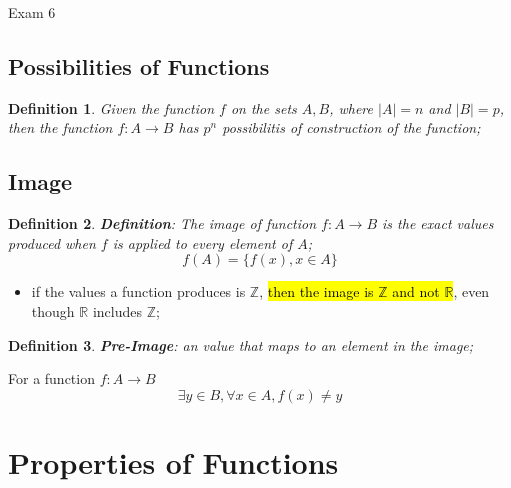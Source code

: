 \documentclass{note}
\newtheorem{definition}{Definition}
\begin{document}
\begin{note}{Exam 6}
        \subsection{Possibilities of Functions}

        \begin{definition}
            Given the function $ f $ on the sets $ A, B $, where $ \left| A \right| = n $ and $ \left| B \right| = p $, then the function
            $ f: A \to B $ has $ p^{n} $ possibilitis of construction of the function;
        \end{definition}

        \subsection{Image}

        \begin{definition}
            \textbf{Definition}: The image of function $ f: A \to B $ is the exact values produced when $ f $ is applied to every element
            of $ A $;
            \begin{equation}\label{eq: definition of image}
                f \left( A \right) = \{ f \left( x \right), x \in A \}
            \end{equation}
        \end{definition}

        \begin{itemize}
            \item if the values a function produces is $ \mathbb{Z} $, \hl{then the image is $ \mathbb{Z} $ and not $ \mathbb{R} $},
            even  though $ \mathbb{R} $ includes $ \mathbb{Z} $;
        \end{itemize}

        \begin{definition}
            \textbf{Pre-Image}: an value that maps to an element in the image;
        \end{definition}

        For a function $ f: A \to B $
        \begin{equation}
            \exists y \in B, \forall x \in A, f(x) \neq y
        \end{equation}

        \section{Properties of Functions}


\end{note}
\end{document}
